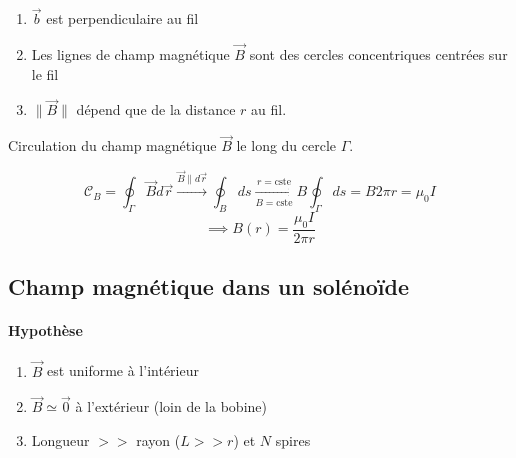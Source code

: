 \documentclass[
    11pt,
    a4paper,
    oneside,
    headinlcude, footinclude,
    twoside,
]{report}
\renewcommand{\vec}[1]{\overrightarrow{#1}}
\begin{document}
\begin{center}
    \begin{minipage}{.5\linewidth}
        \setlength{\parskip}{.3em}
        \begin{enumerate}
            \item $\vec b$ est perpendiculaire au fil

            \item Les lignes de champ magnétique $\vec B$ sont des cercles
                concentriques centrées sur le fil

            \item $\| \vec B\|$ dépend que de la distance $r$ au fil.
        \end{enumerate}
    \end{minipage}
    \begin{minipage}{.49\linewidth}
    \end{minipage}
\end{center}

Circulation du champ magnétique $\vec B$ le long du cercle $\Gamma$.

$$\mathcal{C}_B = \oint_\Gamma \vec B d \vec r \xrightarrow{\vec B \parallel
d\vec r} \oint_B ds \xrightarrow[B = \text{cste}]{r = \text{cste}} B \oint_\Gamma
ds = B 2\pi r = \mu_0 I$$ 
\begin{equation}
    \label{eq:9.16} 
    \implies B(r) = \frac{\mu_0I}{2\pi r}
\end{equation}

\subsection{Champ magnétique dans un solénoïde}
\label{sub:champ_magnetique_dans_un_solenoide}

\paragraph{Hypothèse}


\begin{center}
    \begin{minipage}{.5\linewidth}
        \setlength{\parskip}{.3em}
        \begin{enumerate}
            \item  $\vec B$ est uniforme à l'intérieur

            \item $\vec B \simeq \vec 0$ à l'extérieur (loin de la bobine)

            \item Longueur $>>$ rayon ($L >> r$) et $N$ spires 
        \end{enumerate}
    \end{minipage}
    \begin{minipage}{.49\linewidth}
        \resizebox{\textwidth}{!}{
        }
    \end{minipage}
\end{center}
\end{document}
